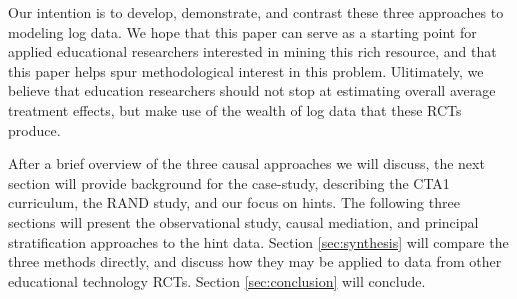 \documentclass{article}
\begin{document}
Our intention is to develop, demonstrate, and contrast these three
approaches to modeling log data.
We hope that this paper can serve as a starting point for
applied educational researchers interested in mining this rich
resource, and that this paper helps spur methodological interest in
this problem.
Ulitimately, we believe that education researchers should not stop at
estimating overall average treatment effects, but make use of the
wealth of log data that these RCTs produce.

After a brief overview of the three causal approaches we will discuss,
the next section will provide background for the case-study,
describing the CTA1 curriculum, the RAND study, and our focus on
hints.
The following three sections will present the observational study,
causal mediation, and principal stratification approaches to the hint
data.
Section \ref{sec:synthesis} will compare the three methods directly,
and discuss how they may be applied to data from other educational
technology RCTs.
Section \ref{sec:conclusion} will conclude.
\end{document}

